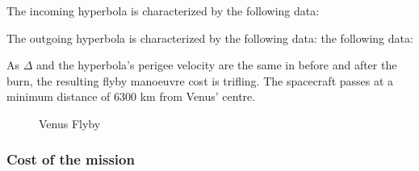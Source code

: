 \documentclass[11pt,a4paper]{report}
\begin{document}
The incoming hyperbola is characterized by the following data:

\begin{table}[H]
\centering
{}
\end{table}

The outgoing hyperbola is characterized by the following data:
the following data:

\begin{table}[H]
\centering
{}
\end{table}

As \textbf{$\Delta$} and the hyperbola's perigee velocity are the same in before and after the burn, the resulting flyby manoeuvre cost is trifling.
The spacecraft passes at a minimum distance of 6300 km from Venus’ centre.

\begin{figure}[H]
\centering
{}
    \caption{Venus Flyby}
\end{figure}

\subsubsection{Cost of the mission}
\end{document}
